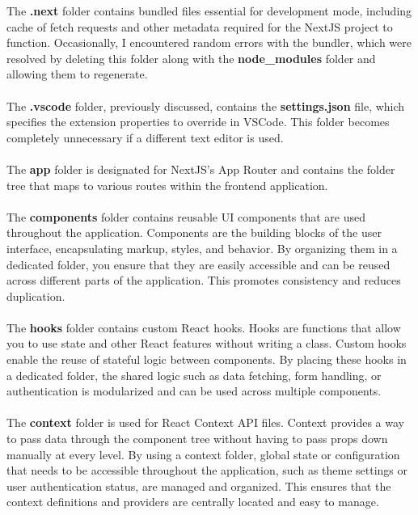 \noindent The \textbf{.next} folder contains bundled files essential for development mode, including cache of fetch requests and other metadata required for the NextJS project to function. Occasionally, I encountered random errors with the bundler, which were resolved by deleting this folder along with the \textbf{node\_modules} folder and allowing them to regenerate.
\\\\
\noindent The \textbf{.vscode} folder, previously discussed, contains the \textbf{settings.json} file, which specifies the extension properties to override in VSCode. This folder becomes completely unnecessary if a different text editor is used.
\\\\
\noindent The \textbf{app} folder is designated for NextJS's App Router and contains the folder tree that maps to various routes within the frontend application.
\\\\
\noindent The \textbf{components} folder contains reusable UI components that are used throughout the application. Components are the building blocks of the user interface, encapsulating markup, styles, and behavior. By organizing them in a dedicated folder, you ensure that they are easily accessible and can be reused across different parts of the application. This promotes consistency and reduces duplication. 
\\\\
\noindent The \textbf{hooks} folder contains custom React hooks. Hooks are functions that allow you to use state and other React features without writing a class. Custom hooks enable the reuse of stateful logic between components. By placing these hooks in a dedicated folder, the shared logic such as data fetching, form handling, or authentication is modularized and can be used across multiple components.
\\\\
\noindent The \textbf{context} folder is used for React Context API files. Context provides a way to pass data through the component tree without having to pass props down manually at every level. By using a context folder, global state or configuration that needs to be accessible throughout the application, such as theme settings or user authentication status, are managed and organized. This ensures that the context definitions and providers are centrally located and easy to manage.
\\\\
